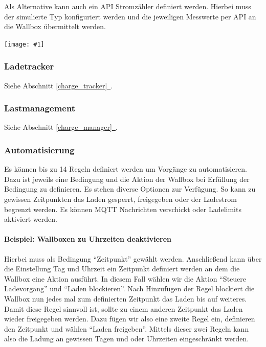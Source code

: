 \documentclass[a4paper,10pt]{article}
\newcommand{\gfx}[1]{\texttt{[image: \#1]}}
\newcommand*{\fullref}[1]{Abschnitt \hyperref[{#1}]{\ref*{#1}~\nameref*{#1}}}
\begin{document}
\begin{multicols*}{2}
    Als Alternative kann auch ein API Stromzähler definiert werden. Hierbei muss
    der simulierte Typ konfiguriert werden und die jeweiligen Messwerte per API
    an die Wallbox übermittelt werden.


    \gfx{./img_warp2/resized/web_meter}

    \vspace{-0.4cm}
    \subsubsection{Ladetracker}
    Siehe \fullref{charge_tracker}.
    \vspace{-0.2cm}
    \subsubsection{Lastmanagement}
    Siehe \fullref{charge_manager}.
     \vspace{-0.2cm}
    \subsubsection{Automatisierung}
    Es können bis zu 14 Regeln definiert werden um Vorgänge zu automatisieren.
    Dazu ist jeweils eine Bedingung und die Aktion der Wallbox bei Erfüllung der
    Bedingung zu definieren. Es stehen diverse Optionen zur Verfügung. So kann
    zu gewissen Zeitpunkten das Laden gesperrt, freigegeben oder der Ladestrom
    begrenzt werden. Es können MQTT Nachrichten verschickt oder Ladelimits
    aktiviert werden.

    \paragraph{Beispiel: Wallboxen zu Uhrzeiten deaktivieren}
    Hierbei muss als Bedingung \enquote{Zeitpunkt} gewählt werden. Anschließend
    kann über die Einstellung Tag und Uhrzeit ein Zeitpunkt definiert werden an
    dem die Wallbox eine Aktion ausführt. In diesem Fall wählen wir die Aktion
    \enquote{Steuere Ladevorgang} und \enquote{Laden blockieren}. Nach
    Hinzufügen der Regel blockiert die Wallbox nun jedes mal zum definierten
    Zeitpunkt das Laden bis auf weiteres. Damit diese Regel sinnvoll ist, sollte
    zu einem anderen Zeitpunkt das Laden wieder freigegeben werden. Dazu fügen
    wir also eine zweite Regel ein, definieren den Zeitpunkt und wählen
    \enquote{Laden freigeben}. Mittels dieser zwei Regeln kann also die Ladung
    an gewissen Tagen und oder Uhrzeiten eingeschränkt werden.




\end{multicols*}
\end{document}

